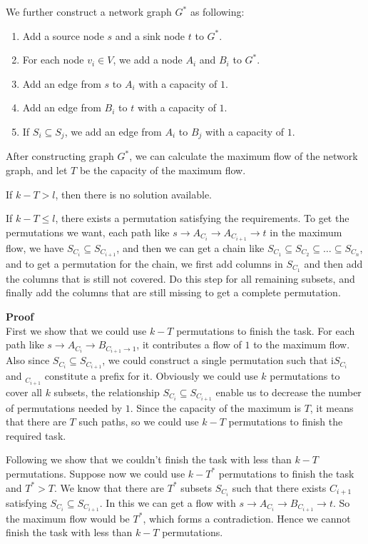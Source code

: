 \documentclass{article}
\newcommand{\Proof}{\vspace{0.3cm} \noindent\textbf{Proof} \\}
\begin{document}
We further construct a network graph $G^*$ as following:
\begin{enumerate}
  \item Add a source node $s$ and a sink node $t$ to $G^*$.
  \item For each node $v_i \in V$, we add a node $A_i$ and $B_i$ to $G^*$.
  \item Add an edge from $s$ to $A_i$ with a capacity of $1$.  
  \item Add an edge from $B_i$ to $t$ with a capacity of $1$.
  \item If $S_i \subseteq S_j$, we add an edge from $A_i$ to $B_j$ with a capacity of $1$.   
\end{enumerate}

After constructing graph $G^*$, we can calculate the maximum flow of the network graph, and let $T$
be the capacity of the maximum flow. 

If $k - T > l$, then there is no solution available. 

If $k-T \leq l$, there exists a permutation satisfying the requirements. To get the permutations we
want, each path like $s \rightarrow A_{C_i} \rightarrow A_{C_{i+1}} \rightarrow t$ in the maximum
flow, we have $S_{C_i} \subseteq S_{C_{i+1}}$, and then we can get a chain like $S_{C_{1}} \subseteq
S_{C_2} \subseteq \dots \subseteq S_{C_n}$, and to get a permutation for the chain, we first add
columns in $S_{C_1}$ and then add the columns that is still not covered. Do this step for all
remaining subsets, and finally add the columns that are still missing to get a complete permutation.          


\Proof
First we show that we could use $k-T$ permutations to finish the task. For each path like $s
\rightarrow A_{C_i} \rightarrow B_{C_{i+1} \rightarrow 1}$, it contributes a flow of $1$ to the
maximum flow. Also since $S_{C_i} \subseteq S_{C_{i+1}}$, we could construct a single permutation
such that i$S_{C_i}$ and $_{C_{i+1}}$ constitute a prefix for it. Obviously we could use $k$
permutations to cover all $k$ subsets, the relationship $S_{C_i} \subseteq S_{C_{i+1}}$ enable us to
decrease the number of permutations needed by $1$. Since the capacity of the maximum is $T$, it
means that there are $T$ such paths, so we could use $k-T$ permutations to finish the required task.

Following we show that we couldn't finish the task with less than $k-T$ permutations. Suppose now we
could use $k - T^*$ permutations to finish the task and $T^* > T$. We know that there are $T^*$
subsets $S_{C_i}$ such that there exists ${C_{i+1}}$ satisfying $S_{C_i} \subseteq S_{C_{i+1}}$. In
this we can get a flow with $s \rightarrow A_{C_i} \rightarrow B_{C_{i+1}} \rightarrow t$. So the
maximum flow would be $T^*$, which forms a contradiction. Hence we cannot finish the task with less
than $k-T$ permutations.
\end{document}
